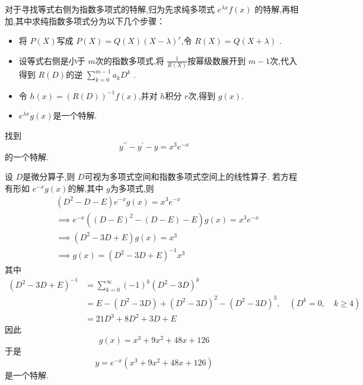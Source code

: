 \documentclass[lang=cn,12pt,color=green,fontset=none]{elegantbook}
\begin{document}
\begin{conclusion}
    对于寻找等式右侧为指数多项式的特解,归为先求纯多项式 \(  e^{\lambda x}f\left( x \right)   \) 的特解,再相加,其中求纯指数多项式分为以下几个步骤：
    \begin{itemize}
        \item 将 \(  P\left( X \right)   \)写成 \(  P\left( X \right)=Q\left( X \right)\left( X-\lambda \right)^{r}     \),令 \(  R\left( X \right)=Q\left( X+ \lambda \right)    \)  . 
        \item 设等式右侧是小于 \(  m  \)次的指数多项式,将 \(  \frac{1}{R\left( X \right) }  \)按幂级数展开到 \(  m-1  \)次,代入得到 \(  R\left( D \right)   \)的逆 \(  \sum _{k=0}^{m-1} a_{k}D^{k}  \) .
        \item 令 \(  h\left( x \right)   = \left( R\left( D \right)  \right)^{-1}  f\left( x \right)   \),并对 \(  h  \)积分 \(  r  \)次,得到 \(  g\left( x \right)   \).
        \item  \(  e^{\lambda x}g\left( x \right)   \)是一个特解.     
    \end{itemize}    
\end{conclusion}
\begin{example}
    找到 \[
    y ^{\prime \prime} -y^{\prime} -y= x^{3}e^{-x}
    \]的一个特解.
\end{example}
\begin{solution}
    设 \(  D  \)是微分算子,则 \(  D  \)可视为多项式空间和指数多项式空间上的线性算子.  
   若方程有形如 \(  e^{-x}g\left( x \right)   \)的解,其中 \(  g  \)为多项式,则  
    \[
    \begin{aligned}
   & \left( D^{2}-D-E \right)e^{-x}g\left( x \right)   = x^{3}e^{-x} \\ 
& \implies e^{-x} \left( \left( D-E \right)^{2}-\left( D-E \right)-E   \right)g\left( x \right) = x^{3}e^{-x}\\ 
 &\implies \left( D^{2}-3D+ E \right)g\left( x \right) = x^{3}\\ 
  & \implies g\left( x \right) = \left( D^{2}-3D+ E \right)^{-1}    x^{3}
    \end{aligned}
    \]其中 \[
    \begin{aligned}
        \left( D^{2}-3D+ E \right)^{-1}& = \sum _{k=0}^{\infty} \left( -1 \right)^{k} \left( D^{2}-3D \right)^{k}\\ 
         & =  E -\left( D^{2}-3D \right)+ \left( D^{2}-3D \right)^{2}-\left( D^{2}-3D \right)^{3}   ,\quad (D^{k}= 0,\quad k \ge 4)\\ 
          & = 21D^{3}+ 8D^{2}+ 3D+ E
    \end{aligned}   
    \]因此 \[
    g\left( x \right) = x^{3}+  9x^{2}+ 48x+ 126 
    \]于是 \[
    y= e^{-x}\left( x^{3}+ 9x^{2}+ 48x+ 126 \right) 
    \]是一个特解.
\end{solution}
\end{document}
